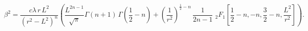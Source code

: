 \begin{equation}
\beta^{2}=\frac{c\lambda\,r\,L^2}{(r^2-L^2)^n}\left(\frac{L^{2n-1}}{\sqrt{\pi}}\Gamma(n+1)\,\Gamma(\frac{1}{2}-n)+\left(\frac{1}{r^2}\right)^{\frac{1}{2}-n}\,\frac{1}{2n-1}\,\,_2F_1[\frac{1}{2}-n,-n,\frac{3}{2}-n,\frac{L^2}{r^2}]\right).
\end{equation}

